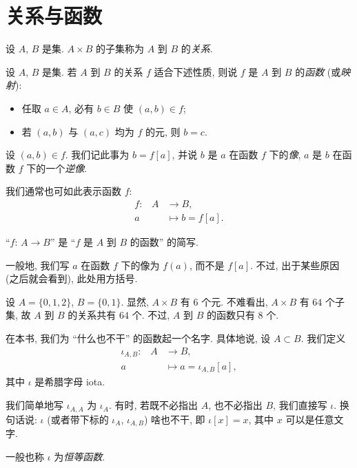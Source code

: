 \section{关系与函数}

\begin{definition}
    设 $A$, $B$ 是集. $A \times B$ 的子集称为 $A$ 到 $B$ 的\emph{关系}.
\end{definition}

\begin{definition}
    设 $A$, $B$ 是集. 若 $A$ 到 $B$ 的关系 $f$ 适合下述性质, 则说 $f$ 是 $A$ 到 $B$ 的\emph{函数} (或\emph{映射}):
    \begin{itemize}
        \item 任取 $a \in A$, 必有 $b \in B$ 使 $(a,b) \in f$;
        \item 若 $(a,b)$ 与 $(a,c)$ 均为 $f$ 的元, 则 $b = c$.
    \end{itemize}
    设 $(a,b) \in f$. 我们记此事为 $b = f[a]$, 并说 $b$ 是 $a$ 在函数 $f$ 下的\emph{像}, $a$ 是 $b$ 在函数 $f$ 下的一个\emph{逆像}.

    我们通常也可如此表示函数 $f$:
    \begin{align*}
        \text{$f$:} \quad
        A & \to B,            \\
        a & \mapsto b = f[a].
    \end{align*}

    ``$f$: $A \to B$'' 是 ``$f$ 是 $A$ 到 $B$ 的函数'' 的简写.
\end{definition}

\begin{remark}
    一般地, 我们写 $a$ 在函数 $f$ 下的像为 $f(a)$, 而不是 $f[a]$. 不过, 出于某些原因 (之后就会看到), 此处用方括号.
\end{remark}

\begin{example}
    设 $A = \{ 0,1,2 \}$, $B = \{ 0,1 \}$. 显然, $A \times B$ 有 $6$ 个元. 不难看出, $A \times B$ 有 $64$ 个子集, 故 $A$ 到 $B$ 的关系共有 $64$ 个. 不过, $A$ 到 $B$ 的函数只有 $8$ 个.
\end{example}

\begin{definition}
    在本书, 我们为 ``什么也不干'' 的函数起一个名字. 具体地说, 设 $A \subset B$. 我们定义
    \begin{align*}
        \text{$\iota_{A,B}$:} \quad
        A & \to B,                       \\
        a & \mapsto a = \iota_{A,B} [a],
    \end{align*}
    其中 $\iota$ 是希腊字母 iota.

    我们简单地写 $\iota_{A,A}$ 为 $\iota_{A}$. 有时, 若既不必指出 $A$, 也不必指出 $B$, 我们直接写 $\iota$. 换句话说: $\iota$ (或者带下标的 $\iota_{A}$, $\iota_{A,B}$) 啥也不干, 即 $\iota[x] = x$, 其中 $x$ 可以是任意文字.

    一般也称 $\iota$ 为\emph{恒等函数}.
\end{definition}

